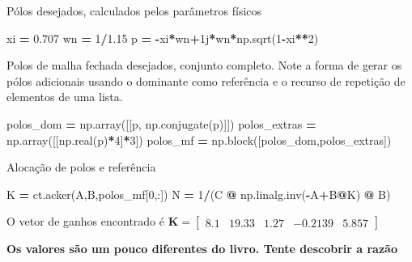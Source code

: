 \documentclass[
]{book}
\newenvironment{Shaded}{\begin{snugshade}}{\end{snugshade}}
\newcommand{\DecValTok}[1]{\textcolor[rgb]{0.00,0.00,0.81}{#1}}
\newcommand{\FloatTok}[1]{\textcolor[rgb]{0.00,0.00,0.81}{#1}}
\newcommand{\NormalTok}[1]{#1}
\newcommand{\OperatorTok}[1]{\textcolor[rgb]{0.81,0.36,0.00}{\textbf{#1}}}
\newcommand{\OtherTok}[1]{\textcolor[rgb]{0.56,0.35,0.01}{#1}}
\begin{document}
Pólos desejados, calculados pelos parâmetros físicos

\begin{Shaded}
\begin{Highlighting}[]
\NormalTok{xi }\OperatorTok{=} \FloatTok{0.707}
\NormalTok{wn }\OperatorTok{=} \DecValTok{1}\OperatorTok{/}\FloatTok{1.15}
\NormalTok{p }\OperatorTok{=} \OperatorTok{{-}}\NormalTok{xi}\OperatorTok{*}\NormalTok{wn}\OperatorTok{+}\OtherTok{1j}\OperatorTok{*}\NormalTok{wn}\OperatorTok{*}\NormalTok{np.sqrt(}\DecValTok{1}\OperatorTok{{-}}\NormalTok{xi}\OperatorTok{**}\DecValTok{2}\NormalTok{)}
\end{Highlighting}
\end{Shaded}

Polos de malha fechada desejados, conjunto completo. Note a forma de gerar os pólos adicionais usando o dominante como referência e o recurso de repetição de elementos de uma lista.

\begin{Shaded}
\begin{Highlighting}[]
\NormalTok{polos\_dom }\OperatorTok{=}\NormalTok{ np.array([[p, np.conjugate(p)]])}
\NormalTok{polos\_extras }\OperatorTok{=}\NormalTok{ np.array([[np.real(p)}\OperatorTok{*}\DecValTok{4}\NormalTok{]}\OperatorTok{*}\DecValTok{3}\NormalTok{])}
\NormalTok{polos\_mf }\OperatorTok{=}\NormalTok{ np.block([polos\_dom,polos\_extras])}
\end{Highlighting}
\end{Shaded}

Alocação de polos e referência

\begin{Shaded}
\begin{Highlighting}[]
\NormalTok{K }\OperatorTok{=}\NormalTok{ ct.acker(A,B,polos\_mf[}\DecValTok{0}\NormalTok{,:])}
\NormalTok{N }\OperatorTok{=} \DecValTok{1}\OperatorTok{/}\NormalTok{(C }\OperatorTok{@}\NormalTok{ np.linalg.inv(}\OperatorTok{{-}}\NormalTok{A}\OperatorTok{+}\NormalTok{B}\OperatorTok{@}\NormalTok{K) }\OperatorTok{@}\NormalTok{ B)}
\end{Highlighting}
\end{Shaded}

O vetor de ganhos encontrado é \(\mathbf{K} = \left[\begin{matrix}8.1 & 19.33 & 1.27 & -0.2139 & 5.857\end{matrix}\right]\)

\textbf{Os valores são um pouco diferentes do livro. Tente descobrir a razão}
\end{document}
